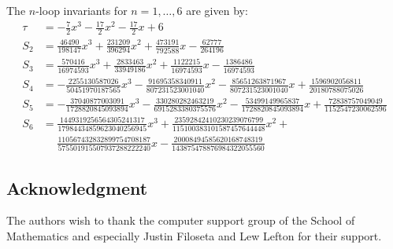 \documentclass[12pt]{amsart}
\theoremstyle{definition}
\begin{document}
The $n$-loop invariants for $n=1,\dots,6$ are given by:
{\small
\begin{align*}
\tau &=-\frac{7}{2} x^{3} - \frac{17}{2} x^{2} - \frac{17}{2} x + 6
\\
S_2 &= \frac{46490}{198147} x^{3} + \frac{231209}{396294} x^{2} 
+ \frac{473191}{792588} x - \frac{62777}{264196}
\\
S_3 &= \frac{570416}{16974593} x^{3} + \frac{2833463}{33949186} x^{2} 
+ \frac{1122215}{16974593} x - \frac{1386486}{16974593}
\\
S_4 &= -\frac{2255130587026}{50451970187565} x^{3} 
- \frac{91695358340911}{807231523001040} x^{2} 
- \frac{85651263871967}{807231523001040} x 
+ \frac{1596902056811}{20180788075026}
\\
S_5 &= -\frac{37040877003091}{1728820845093894} x^{3} 
- \frac{330280282463219}{6915283380375576} x^{2} 
- \frac{53499149965837}{1728820845093894} x 
+ \frac{72838757049049}{1152547230062596}
\\
S_6 &= \frac{1449319256564305241317}{17984434859623040256945} x^3 +
\frac{23592842410230239076799}{115100383101587457644448} x^2 +
\\ & \quad\,\,
\frac{110567432832899754708187}{575501915507937288222240} x -
\frac{20008494585620168748319}{143875478876984322055560}
\end{align*}
}

\subsection*{Acknowledgment}
The authors wish to thank the computer support group of the School of 
Mathematics and especially Justin Filoseta and Lew Lefton for their support.




\end{document}
